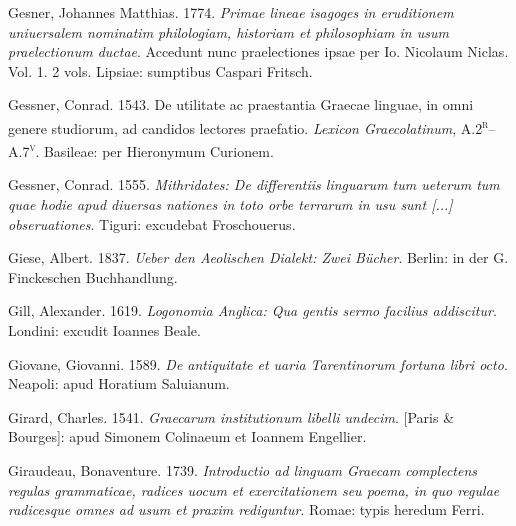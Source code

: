 \begin{styleStandard}
Gesner, Johannes Matthias. 1774. \textit{Primae lineae isagoges in eruditionem uniuersalem nominatim philologiam, historiam et philosophiam in usum praelectionum ductae}. Accedunt nunc praelectiones ipsae per Io. Nicolaum Niclas. Vol. 1. 2 vols. Lipsiae: sumptibus Caspari Fritsch.
\end{styleStandard}

\begin{styleStandard}
Gessner, Conrad. 1543. De utilitate ac praestantia Graecae linguae, in omni genere studiorum, ad candidos lectores praefatio. \textit{Lexicon Graecolatinum}, A.2\textsc{\textsuperscript{r}}–A.7\textsc{\textsuperscript{v}}. Basileae: per Hieronymum Curionem.
\end{styleStandard}

\begin{styleStandard}
Gessner, Conrad. 1555. \textit{Mithridates: De differentiis linguarum tum ueterum tum quae hodie apud diuersas nationes in toto orbe terrarum in usu sunt [...] obseruationes}. Tiguri: excudebat Froschouerus.
\end{styleStandard}

\begin{styleStandard}
Giese, Albert. 1837. \textit{Ueber den Aeolischen Dialekt: Zwei Bücher}. Berlin: in der G. Finckeschen Buchhandlung.
\end{styleStandard}

\begin{styleStandard}
Gill, Alexander. 1619. \textit{Logonomia Anglica: Qua gentis sermo facilius addiscitur}. Londini: excudit Ioannes Beale.
\end{styleStandard}

\begin{styleStandard}
Giovane, Giovanni. 1589. \textit{De antiquitate et uaria Tarentinorum fortuna libri octo}. Neapoli: apud Horatium Saluianum.
\end{styleStandard}

\begin{styleStandard}
Girard, Charles. 1541. \textit{Graecarum institutionum libelli undecim}. [Paris \& Bourges]: apud Simonem Colinaeum et Ioannem Engellier.
\end{styleStandard}

\begin{styleStandard}
Giraudeau, Bonaventure. 1739. \textit{Introductio ad linguam Graecam complectens regulas grammaticae, radices uocum et exercitationem seu poema, in quo regulae radicesque omnes ad usum et praxim rediguntur}. Romae: typis heredum Ferri.
\end{styleStandard}

